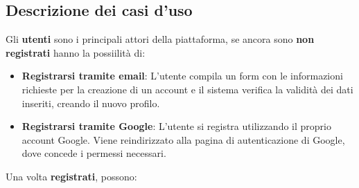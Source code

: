 \documentclass{book}
\begin{document}
\subsection{Descrizione dei casi d'uso}
Gli \textbf{utenti} sono i principali attori della piattaforma, se ancora sono \textbf{non registrati} hanno la possiilità di:
\begin{itemize}
    \item \textbf{Registrarsi tramite email}: L'utente compila un form con le informazioni richieste per la creazione di un account e il sistema verifica la validità dei dati inseriti, creando il nuovo profilo.
    \item \textbf{Registrarsi tramite Google}: L'utente si registra utilizzando il proprio account Google. Viene reindirizzato alla pagina di autenticazione di Google, dove concede i permessi necessari.
\end{itemize}
Una volta \textbf{registrati}, possono:
\end{document}
